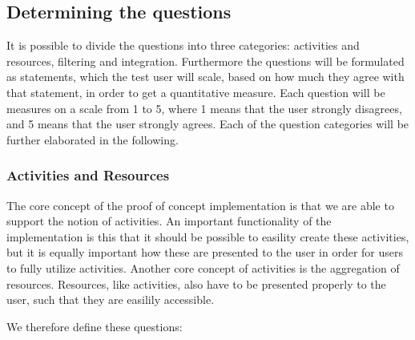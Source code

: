 \subsection{Determining the questions}
It is possible to divide the questions into three categories: activities and resources, filtering and integration. Furthermore the questions will be formulated as statements, which the test user will scale, based on how much they agree with that statement, in order to get a quantitative measure. Each question will be measures on a scale from 1 to 5, where 1 means that the user strongly disagrees, and 5 means that the user strongly agrees.
Each of the question categories will be further elaborated in the following.

\subsubsection{Activities and Resources}
The core concept of the proof of concept implementation is that we are able to support the notion of activities. An important functionality of the implementation is this that it should be possible to easility create these activities, but it is equally important how these are presented to the user in order for users to fully utilize activities. Another core concept of activities is the aggregation of resources. Resources, like activities, also have to be presented properly to the user, such that they are easilily accessible. 

We therefore define these questions:

